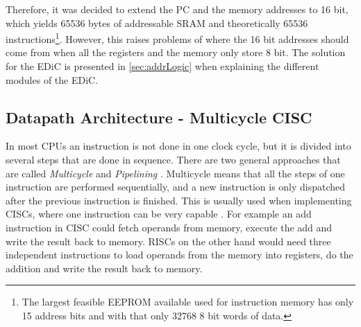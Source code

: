Therefore, it was decided to extend the \gls{PC} and the memory addresses to 16 bit, which yields 65536 bytes of addressable \gls{SRAM} and theoretically 65536 instructions\footnote{The largest feasible \gls{EEPROM} available used for instruction memory has only 15 address bits and with that only 32768 8 bit words of data.}.
However, this raises problems of where the 16 bit addresses should come from when all the registers and the memory only store 8 bit.
The solution for the \gls{EDiC} is presented in \cref{sec:addrLogic} when explaining the different modules of the \gls{EDiC}.

\subsection{Datapath Architecture - Multicycle CISC}\label{sec:cisc}
In most \glspl{CPU} an instruction is not done in one clock cycle, but it is divided into several steps that are done in sequence.
There are two general approaches that are called \emph{Multicycle} and \emph{Pipelining} \cite{PattersonDavid2016RuRD}.
Multicycle means that all the steps of one instruction are performed sequentially, and a new instruction is only dispatched after the previous instruction is finished.
This is usually used when implementing \glspl{CISC}, where one instruction can be very capable \cite{chen_novick_shimano_2000}.
For example an add instruction in \gls{CISC} could fetch operands from memory, execute the add and write the result back to memory.
\glspl{RISC} on the other hand would need three independent instructions to load operands from the memory into registers, do the addition and write the result back to memory.

